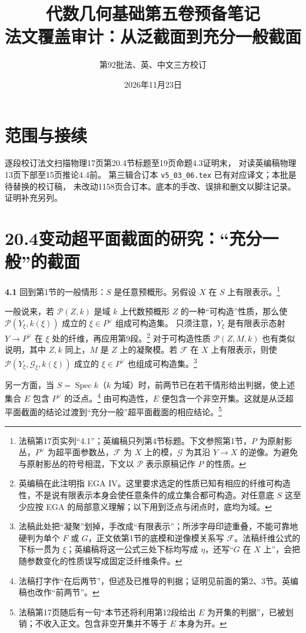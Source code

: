 \documentclass[openany,fontset=fandol]{ctexbook}
\DeclareMathOperator{\Spec}{Spec}
\newcommand{\FF}{\mathcal F}
\newcommand{\GG}{\mathcal G}
\newcommand{\calP}{\mathcal P}
\newcommand{\tagitem}[2]{\par\medskip\noindent\textbf{#1\quad #2}\enspace}
\begin{document}
\title{代数几何基础第五卷预备笔记\\法文覆盖审计：从泛截面到充分一般截面}
\author{第92批\quad 法、英、中文三方校订}
\date{2026年11月23日}
\maketitle

\section*{范围与接续}
逐段校订法文扫描物理17页第20.4节标题至19页命题4.3证明末，
对读英编稿物理13页下部至15页推论4.4前。
第三辑合订本 \texttt{v5\_03\_06.tex} 已有对应译文；本批是待替换的校订稿，
未改动1158页合订本。底本的手改、误排和删文以脚注记录。证明补充另列。

\section*{20.4\quad 变动超平面截面的研究：“充分一般”的截面}
\tagitem{4.1}{}
回到第1节的一般情形：$S$ 是任意预概形。另假设 $X$ 在 $S$ 上有限表示。\footnote{法稿第17页实列“4.1”；英编稿只列第4节标题。下文参照第1节，$P$ 为原射影丛，$P^\vee$ 为超平面参数丛，$\FF$ 为 $X$ 上的模，$\GG$ 为其沿 $Y\to X$ 的逆像。为避免与原射影丛的符号相混，下文以 $\calP$ 表示原稿记作 $P$ 的性质。}

一般说来，若 $\calP(Z,k)$ 是域 $k$ 上代数预概形 $Z$ 的一种“可构造”性质，那么使
$\calP(Y_\xi,k(\xi))$ 成立的 $\xi\in P^\vee$ 组成可构造集。
只须注意，$Y_\xi$ 是有限表示态射 $Y\to P^\vee$ 在 $\xi$ 处的纤维，再应用第9段。\footnote{英编稿在此注明指 EGA IV。这里要求选定的性质已知有相应的纤维可构造性，不是说有限表示本身会使任意条件的成立集合都可构造。对任意底 $S$ 这至少应按 EGA 的局部意义理解；以下用到泛点与闭点时，底均为域。}
对于可构造性质 $\calP(Z,M,k)$ 也有类似说明，其中 $Z,k$ 同上，$M$ 是 $Z$ 上的凝聚模。若 $\FF$ 在 $X$ 上有限表示，则使
$\calP(Y_\xi,\GG_\xi,k(\xi))$ 成立的 $\xi\in P^\vee$ 也组成可构造集。\footnote{法稿此处把“凝聚”划掉，手改成“有限表示”；所涉字母印迹重叠，不能可靠地硬判为单个 $F$ 或 $G$，正文依第1节的底模和逆像模关系写 $\FF$。法稿纤维公式的下标一贯为 $\xi$；英编稿将这一公式三处下标均写成 $\eta$，还写“$G$ 在 $X$ 上”，会把随参数变化的性质误写成固定泛纤维条件。}

另一方面，当 $S=\Spec k$（$k$ 为域）时，前两节已在若干情形给出判据，使上述集合 $E$ 包含 $P^\vee$ 的泛点。\footnote{法稿打字作“在后两节”，但述及已推导的判据；证明见前面的第2、3节。英编稿也改作“前两节”。}
由可构造性，$E$ 便包含一个非空开集。这就是从泛超平面截面的结论过渡到“充分一般”超平面截面的相应结论。\footnote{法稿第17页随后有一句“本节还将利用第12段给出 $E$ 为开集的判据”，已被划销；不收入正文。包含非空开集并不等于 $E$ 本身为开。}
\end{document}
